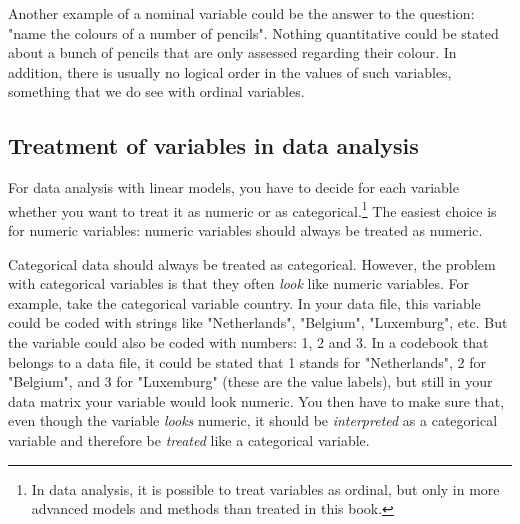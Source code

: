 Another example of a nominal variable could be the answer to the question: "name the colours of a number of pencils". Nothing quantitative could be stated about a bunch of pencils that are only assessed regarding their colour. In addition, there is usually no logical order in the values of such variables, something that we do see with ordinal variables.



\subsection{Treatment of variables in data analysis}
For data analysis with linear models, you have to decide for each variable whether you want to treat it as numeric or as categorical.\footnote{In data analysis, it is possible to treat variables as ordinal, but only in more advanced models and methods than treated in this book.} The easiest choice is for numeric variables: numeric variables should always be treated as numeric.

Categorical data should always be treated as categorical. However, the problem with categorical variables is that they often \textit{look} like numeric variables. For example, take the categorical variable country. In your data file, this variable could be coded with strings like "Netherlands", "Belgium", "Luxemburg", etc. But the variable could also be coded with numbers: 1, 2 and 3. In a codebook that belongs to a data file, it could be stated that 1 stands for "Netherlands", 2 for "Belgium", and 3 for "Luxemburg" (these are the value labels), but still in your data matrix your variable would look numeric. You then have to make sure that, even though the variable \textit{looks} numeric, it should be \textit{interpreted} as a categorical variable and therefore be \textit{treated} like a categorical variable.

